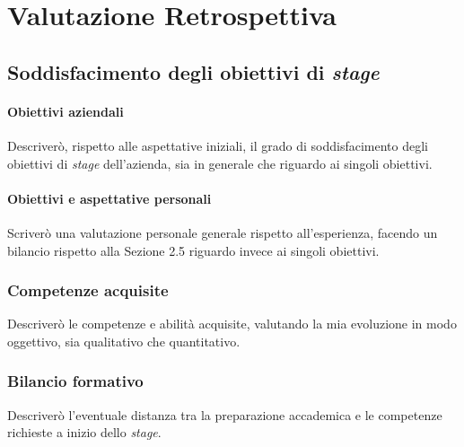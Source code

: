 \chapter{Valutazione Retrospettiva}
    \section{Soddisfacimento degli obiettivi di \textit{stage}}
        \subsubsection{Obiettivi aziendali}
        Descriverò, rispetto alle aspettative iniziali, il grado di soddisfacimento degli obiettivi di \textit{stage} dell'azienda, sia in generale che riguardo ai singoli obiettivi. 
        \subsubsection{Obiettivi e aspettative personali}
        Scriverò una valutazione personale generale rispetto all'esperienza, facendo un bilancio rispetto alla Sezione 2.5 riguardo invece ai singoli obiettivi. 
    \subsection{Competenze acquisite}
    Descriverò le competenze e abilità acquisite, valutando la mia evoluzione in modo oggettivo, sia qualitativo che quantitativo. 
    \subsection{Bilancio formativo}
    Descriverò l'eventuale distanza tra la preparazione accademica e le competenze richieste a inizio dello \textit{stage}.